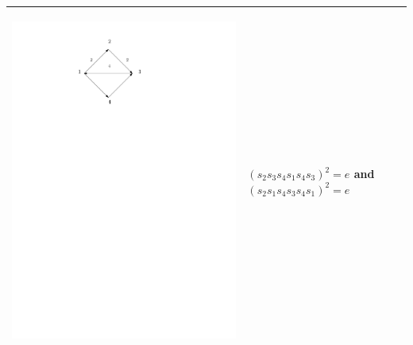 \documentclass[11pt]{amsart}
\theoremstyle{definition}
\begin{document}
\begin{table}[h]
\begin{tabular}{| p{3.5cm} | p{7cm} |}
\begin{center}\includegraphics[scale = .30]{Diagram3.pdf}\end{center} & $(s_{2}s_{3}s_{4}s_{1}s_{4}s_{3})^{2} = e$ and $(s_{2}s_{1}s_{4}s_{3}s_{4}s_{1})^{2} = e$\\ \hline


\end{tabular}
\end{table}
\end{document}
